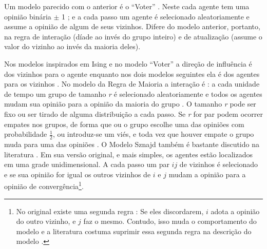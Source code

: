   Um modelo parecido com o anterior é o ``Voter'' \cite{holley1975ergodic}. Neste
  cada agente tem uma opinião binária \(\pm\) 1 ; e a cada passo um agente é
  selecionado aleatoriamente e assume a opinião de algum de seus vizinhos.
  Difere do modelo anterior, portanto, na regra de interação (díade ao invés do
  grupo inteiro) e de atualização (assume o valor do vizinho ao invés da maioria
  deles).

  Nos modelos inspirados em Ising e no modelo ``Voter'' a direção de influência
  é dos vizinhos para o agente enquanto nos dois modelos seguintes ela é dos
  agentes para os vizinhos \cite{stauffer2003convince}. No modelo da Regra de
  Maioria a interação é : a cada unidade de tempo um grupo de tamanho \textit{r}
  é selecionado aleatoriamente e todos os agentes mudam sua opinião para a
  opinião da maioria do grupo \cite{galam1990social,galam2012sociophysics}. O
  tamanho \textit{r} pode ser fixo ou ser tirado de alguma distribuição a cada
  passo. Se \textit{r} for par podem ocorrer empates nos grupos, de forma que ou
  o grupo escolhe uma das opiniões com probabilidade \(\frac{1}{2}\), ou
  introduz-se um viés, e toda vez que houver empate o grupo muda para uma das
  opiniões \cite{galam2012sociophysics, galam1986majority}. O Modelo Sznajd
  também é bastante discutido na literatura \cite{sznajd2000opinion,
    sirbu2017opinion,castellano2012social}. Em sua versão original, e mais
  simples, os agentes estão localizados em uma grade unidimensional. A cada
  passo um par $ij$ de vizinhos é selecionado e se sua opinião for igual os
  outros vizinhos de \(i\) e \(j\) mudam a opinião para a opinião de
  convergência\footnote{No original existe uma segunda regra : Se eles
    discordarem, \(i\) adota a opinião do outro vizinho, e \(j\) faz o mesmo.
    Contudo, isso muda o comportamento do modelo e a literatura costuma suprimir
    essa segunda regra na descrição do modelo \cite{castellano2012social,
      stauffer2003convince}.}.

